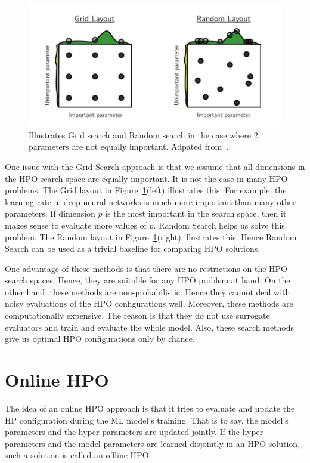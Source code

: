 \documentclass[12pt, twoside, ngerman]{report}
\begin{document}
\begin{figure}[htb]
  \centering
    \includegraphics[scale=0.8]{images/rsgsexample}
    \caption{Illustrates Grid search and Random search in the case where 2 parameters are not equally important.  Adpated from~\cite{rshpoarticle}.}
    \label{fig:rshpofig}
\end{figure}

One issue with the Grid Search approach is that we assume that all dimensions in the HPO search space are equally important. It is not the case in many HPO problems. The Grid layout in Figure~\ref{fig:rshpofig}(left) illustrates this. For example, the learning rate in deep neural networks is much more important than many other parameters. If dimension $p$ is the most important in the search space, then it makes sense to evaluate more values of $p$. Random Search helps us solve this problem. 
The Random layout in Figure~\ref{fig:rshpofig}(right) illustrates this. 
Hence Random Search can be used as a trivial baseline for comparing HPO solutions.

One advantage of these methods is that there are no restrictions on the HPO search spaces. Hence, they are suitable for any HPO problem at hand.
On the other hand, these methods are non-probabilistic.
Hence they cannot deal with noisy evaluations of the HPO configurations well.
Moreover, these methods are computationally expensive. The reason is that they do not use surrogate evaluators and train and evaluate the whole model.
Also, these search methods give us optimal HPO configurations only by chance.

\section{Online HPO}
The idea of an online HPO approach is that it tries to evaluate and update the HP configuration during the ML model's training. That is to say, the model's parameters and the hyper-parameters are updated jointly.
If the hyper-parameters and the model parameters are learned disjointly in an HPO solution, such a solution is called an offline HPO.
\end{document}
